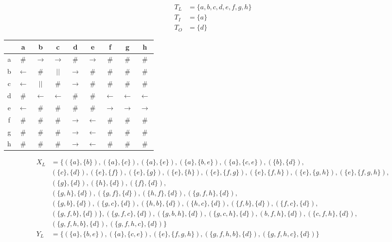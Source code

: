 \begin{align*}
T_L &= \{ a,b,c,d,e,f,g,h\}\\
T_I &= \{a\}\\
T_O &= \{d\}
\end{align*}
\begin{tabular}{c | c c c c c c c c}
	&a 	  		  &b 			 &c 			&d 	  			&e 			   &f			&g			&h\\
	\hline
a	&$\#$ 		  &$\rightarrow$ &$\rightarrow$	&$\#$ 			&$\rightarrow$ &$\#$		&$\#$
   	&$\#$\\
b	&$\leftarrow$ &$\#$			 &$||$ 			&$\rightarrow$	&$\#$ 		   &$\#$		&$\#$	
	&$\#$\\
c	&$\leftarrow$ &$||$			 &$\#$			&$\rightarrow$  &$\#$ 		   &$\#$		&$\#$	
	&$\#$\\
d	&$\#$ 		  &$\leftarrow$  &$\leftarrow$	&$\#$			&$\#$ 		   &$\leftarrow$
	&$\leftarrow$ &$\leftarrow$\\
e	&$\leftarrow$ &$\#$ 		 &$\#$			&$\#$  			&$\#$		   &$\rightarrow$
	&$\rightarrow$	&$\rightarrow$\\
f	&$\#$ 		  &$\#$			 &$\#$			&$\rightarrow$	&$\leftarrow$  &$\#$		&$\#$     
&$\#$\\
g	&$\#$ 		  &$\#$			 &$\#$			&$\rightarrow$	&$\leftarrow$  &$\#$		&$\#$     
&$\#$\\
h	&$\#$ 		  &$\#$			 &$\#$			&$\rightarrow$	&$\leftarrow$  &$\#$		&$\#$     
&$\#$\\
\end{tabular}

\begin{align*}
X_L &= \{ (\{a\},\{b\}),(\{a\},\{c\})
,(\{a\},\{e\}),(\{a\},\{b,e\}),(\{a\},\{c,e\}),(\{b\},\{d\}),\\
&(\{c\},\{d\}),(\{e\},\{f\}),(\{e\},\{g\}),(\{e\},\{h\}),(\{e\},\{f,g\}),(\{e\},\{f,h\}),(\{e\},\{g,h\}),(\{e\},\{f,g,h\}),\\
&(\{g\},\{d\}),(\{h\},\{d\}),(\{f\},\{d\}),\\
&(\{g,h\},\{d\}),(\{g,f\},\{d\}),(\{h,f\},\{d\}),(\{g,f,h\},\{d\}),\\
&(\{g,b\},\{d\}),(\{g,c\},\{d\}),(\{h,b\},\{d\}),(\{h,c\},\{d\}),(\{f,b\},\{d\}),(\{f,c\},\{d\}),\\
&(\{g,f,b\},\{d\})\},(\{g,f,c\},\{d\}),(\{g,b,h\},\{d\}),(\{g,c,h\},\{d\}),(b,f,h\},\{d\}),(\{c,f,h\},\{d\}),\\
&(\{g,f,h,b\},\{d\}),(\{g,f,h,c\},\{d\})\}\\
Y_L &=
\{(\{a\},\{b,e\}),(\{a\},\{c,e\}),(\{e\},\{f,g,h\}),(\{g,f,h,b\},\{d\}),(\{g,f,h,c\},\{d\})\}\\
\end{align*}

